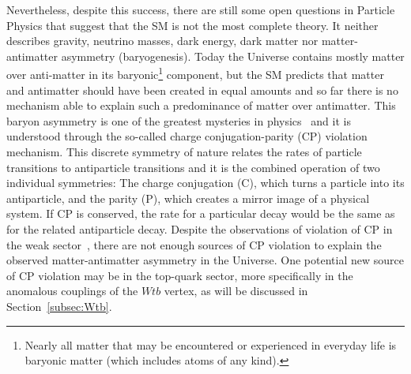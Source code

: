 Nevertheless, despite this success, there are still some open questions in Particle Physics that suggest that the SM is not the most complete theory. It neither describes gravity, neutrino masses, dark energy, dark matter nor matter-antimatter asymmetry (baryogenesis). Today the Universe contains mostly matter over anti-matter in its baryonic\footnote{Nearly all matter that may be encountered or experienced in everyday life is baryonic matter (which includes atoms of any kind).} component, but the SM predicts that matter and antimatter should have been created in equal amounts and so far there is no mechanism able to explain such a predominance of matter over antimatter. This baryon asymmetry is one of the greatest mysteries in physics~\cite{Canetti:2012zc} and it is understood through the so-called charge conjugation-parity (CP) violation mechanism. This discrete symmetry of nature relates the rates of particle transitions to antiparticle transitions and it is the combined operation of two individual symmetries: The charge conjugation (C), which turns a particle into its antiparticle, and the parity (P), which creates a mirror image of a physical system. If CP is conserved, the rate for a particular decay would be the same as for the related antiparticle decay. Despite the observations of violation of CP in the weak sector~\cite{Christenson:1964fg}, there are not enough sources of CP violation to explain the observed matter-antimatter asymmetry in the Universe. One potential new source of CP violation may be in the top-quark sector, more specifically in the anomalous couplings of the $Wtb$ vertex, as will be discussed in Section~\ref{subsec:Wtb}.


